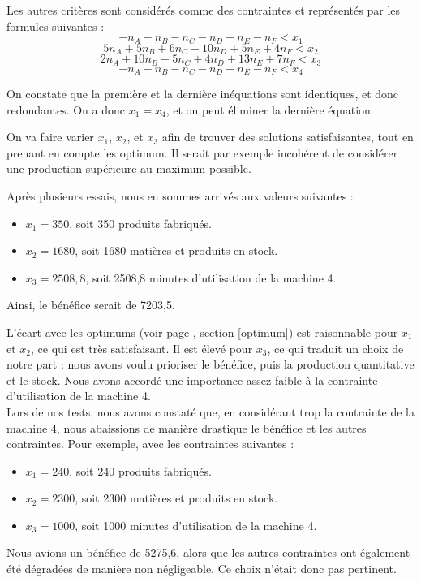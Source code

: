 \documentclass[a4paper,10pt]{article}
\begin{document}
Les autres critères sont considérés comme des contraintes et représentés par les formules suivantes :
$$ - n_A - n_B - n_C - n_D - n_E - n_F < x_1 $$
$$ 5n_A + 5n_B + 6n_C + 10n_D + 5n_E + 4n_F < x_2 $$
$$ 2n_A + 10n_B + 5n_C + 4n_D + 13n_E + 7n_F < x_3 $$
$$ - n_A - n_B - n_C - n_D - n_E - n_F < x_4 $$ 

On constate que la première et la dernière inéquations sont identiques, et donc redondantes. On a donc $x_1 = x_4$, et on peut éliminer la dernière équation.

On va faire varier $x_1$, $x_2$, et $x_3$ afin de trouver des solutions satisfaisantes, tout en prenant en compte les optimum. Il serait par exemple incohérent de considérer une production supérieure au maximum possible.

Après plusieurs essais, nous en sommes arrivés aux valeurs suivantes :
\begin{itemize}
\item $x_1 = 350$, soit 350 produits fabriqués.
\item $x_2 = 1680$, soit 1680 matières et produits en stock.
\item $x_3 = 2508,8$, soit 2508,8 minutes d'utilisation de la machine 4.
\end{itemize}

Ainsi, le bénéfice serait de 7203,5.

L'écart avec les optimums (voir page \pageref{optimum}, section \ref{optimum}) est raisonnable pour $x_1$ et $x_2$, ce qui est très satisfaisant. Il est élevé pour $x_3$, ce qui traduit un choix de notre part : nous avons voulu prioriser le bénéfice, puis la production quantitative et le stock. Nous avons accordé une importance assez faible à la contrainte d'utilisation de la machine 4.
\\

Lors de nos tests, nous avons constaté que, en considérant trop la contrainte de la machine 4, nous abaissions de manière drastique le bénéfice et les autres contraintes. Pour exemple, avec les contraintes suivantes :
\begin{itemize}
\item $x_1 = 240$, soit 240 produits fabriqués.
\item $x_2 = 2300$, soit 2300 matières et produits en stock.
\item $x_3 = 1000$, soit 1000 minutes d'utilisation de la machine 4.
\end{itemize}
Nous avions un bénéfice de 5275,6, alors que les autres contraintes ont également été dégradées de manière non négligeable. Ce choix n'était donc pas pertinent.
\end{document}

